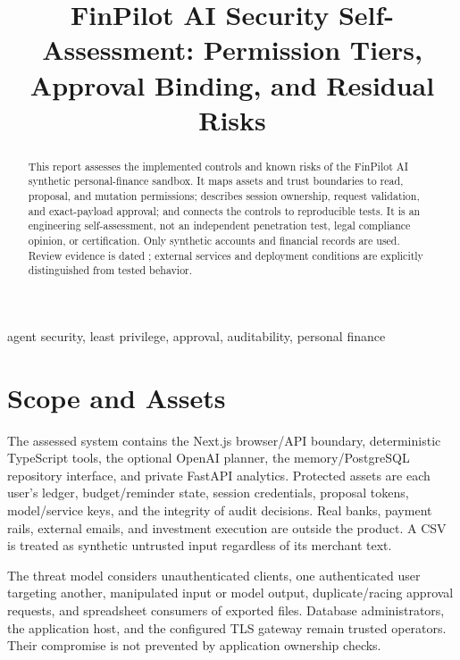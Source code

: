 \documentclass[conference,a4paper]{IEEEtran}
\title{FinPilot AI Security Self-Assessment: Permission Tiers, Approval Binding, and Residual Risks}
\begin{document}
\maketitle
\begin{abstract}
This report assesses the implemented controls and known risks of the FinPilot AI synthetic personal-finance sandbox. It maps assets and trust boundaries to read, proposal, and mutation permissions; describes session ownership, request validation, and exact-payload approval; and connects the controls to reproducible tests. It is an engineering self-assessment, not an independent penetration test, legal compliance opinion, or certification. Only synthetic accounts and financial records are used. Review evidence is dated \EvidenceDate{}; external services and deployment conditions are explicitly distinguished from tested behavior.
\end{abstract}
\begin{IEEEkeywords}agent security, least privilege, approval, auditability, personal finance\end{IEEEkeywords}

\section{Scope and Assets}
The assessed system contains the Next.js browser/API boundary, deterministic TypeScript tools, the optional OpenAI planner, the memory/PostgreSQL repository interface, and private FastAPI analytics. Protected assets are each user's ledger, budget/reminder state, session credentials, proposal tokens, model/service keys, and the integrity of audit decisions. Real banks, payment rails, external emails, and investment execution are outside the product. A CSV is treated as synthetic untrusted input regardless of its merchant text.

The threat model considers unauthenticated clients, one authenticated user targeting another, manipulated input or model output, duplicate/racing approval requests, and spreadsheet consumers of exported files. Database administrators, the application host, and the configured TLS gateway remain trusted operators. Their compromise is not prevented by application ownership checks.
\end{document}
